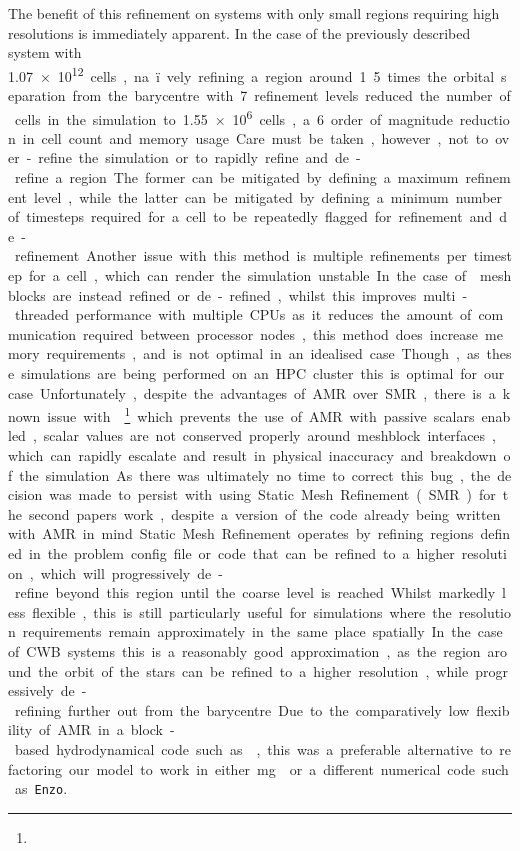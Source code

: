The benefit of this refinement on systems with only small regions requiring high resolutions is immediately apparent.
In the case of the previously described system with \SI{1.07e12} cells, na\"ively refining a region around 1.5 times the orbital separation from the barycentre with 7 refinement levels reduced the number of cells in the simulation to \num{1.55e6} cells, a 6 order of magnitude reduction in cell count and memory usage.
Care must be taken, however, not to over-refine the simulation or to rapidly refine and de-refine a region.
The former can be mitigated by defining a maximum refinement level, while the latter can be mitigated by defining a minimum number of timesteps required for a cell to be repeatedly flagged for refinement and de-refinement.
Another issue with this method is multiple refinements per timestep for a cell, which can render the simulation unstable.

In the case of \athena{} meshblocks are instead refined or de-refined, whilst this improves multi-threaded performance with multiple CPUs as it reduces the amount of communication required between processor nodes, this method does increase memory requirements, and is not optimal in an idealised case.
Though, as these simulations are being performed on an HPC cluster this is optimal for our case.
Unfortunately, despite the advantages of AMR over SMR, there is a known issue with \athena{}\footnote{} which prevents the use of AMR with passive scalars enabled, scalar values are not conserved properly around meshblock interfaces, which can rapidly escalate and result in physical inaccuracy and breakdown of the simulation.
As there was ultimately no time to correct this bug, the decision was made to persist with using Static Mesh Refinement (SMR) for the second papers work, despite a version of the code already being written with AMR in mind.

Static Mesh Refinement operates by refining regions defined in the problem config file or code that can be refined to a higher resolution, which will progressively de-refine beyond this region until the coarse level is reached.
Whilst markedly less flexible, this is still particularly useful for simulations where the resolution requirements remain approximately in the same place spatially.
In the case of CWB systems this is a reasonably good approximation, as the region around the orbit of the stars can be refined to a higher resolution, while progressively de-refining further out from the barycentre.
Due to the comparatively low flexibility of AMR in a block-based hydrodynamical code such as \athena{}, this was a preferable alternative to refactoring our model to work in either \mg{} or a different numerical code such as \texttt{Enzo}.


